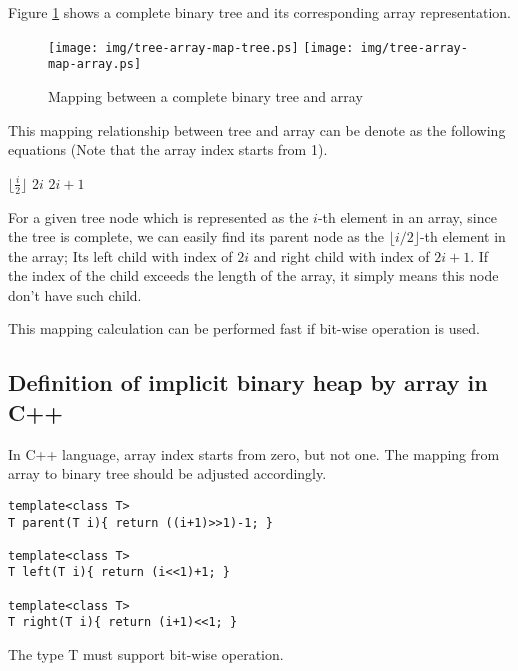 \documentclass{article}
\begin{document}
Figure \ref{fig:tree-array-map} shows a complete binary tree and
its corresponding array representation.

\begin{figure}[htbp]
       \begin{center}
       	  \texttt{[image: img/tree-array-map-tree.ps]}
          \texttt{[image: img/tree-array-map-array.ps]}
        \caption{Mapping between a complete binary tree and array} \label{fig:tree-array-map}
       \end{center}
\end{figure}

This mapping relationship between tree and array can be denote as 
the following equations (Note that the array index starts from 1).

\begin{algorithmic}[1]
  \State \Return $\lfloor \frac{i}{2} \rfloor$
\EndFunction
\Statex
{}
  \State \Return $2i$
\EndFunction
\Statex
{}
  \State \Return $2i+1$
\EndFunction
\end{algorithmic}

For a given tree node which is represented as the $i$-th element in an
array, since the tree is complete, we can easily find its parent node
as the $\lfloor i/2 \rfloor$-th element in the array; Its left child
with index of $2i$ and right child with index of $2i+1$. If the index
of the child exceeds the length of the array, it simply means this 
node don't have such child.

This mapping calculation can be performed fast if bit-wise operation
is used.

\subsection*{Definition of implicit binary heap by array in C++}
In C++ language, array index starts from zero, but not one. The mapping
from array to binary tree should be adjusted accordingly.

\lstset{language=C++}
\begin{lstlisting}
template<class T>
T parent(T i){ return ((i+1)>>1)-1; }

template<class T>
T left(T i){ return (i<<1)+1; }

template<class T>
T right(T i){ return (i+1)<<1; }
\end{lstlisting}

The type T must support bit-wise operation.
\end{document}
